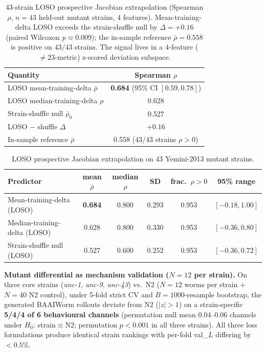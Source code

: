\documentclass[11pt]{article}
\begin{document}
\begin{table}[H]
\centering\small
\caption{43-strain LOSO prospective Jacobian extrapolation (Spearman $\rho$, $n{=}43$ held-out mutant strains, $4$ features). Mean-training-delta LOSO exceeds the strain-shuffle null by $\Delta{=}{+}0.16$ (paired Wilcoxon $p{\approx}0.009$); the in-sample reference $\bar\rho{=}0.558$ is positive on $43/43$ strains. The signal lives in a $4$-feature ($\ne 23$-metric) z-scored deviation subspace.}
\label{tab:loso_summary}
\begin{tabular}{lc}\toprule
Quantity & Spearman $\rho$ \\\midrule
LOSO mean-training-delta $\bar\rho$ & \textbf{0.684} (95\% CI $[0.59,0.78]$) \\
LOSO median-training-delta $\rho$ & 0.628 \\
Strain-shuffle null $\bar\rho_0$ & 0.527 \\
LOSO $-$ shuffle $\Delta$ & $+0.16$ \\
In-sample reference $\bar\rho$ & 0.558 ($43/43$ strains $\rho{>}0$) \\\bottomrule
\end{tabular}
\end{table}

\begin{table}[H]
\centering\small
\caption{LOSO prospective Jacobian extrapolation on 43 Yemini-2013 mutant strains.}
\label{tab:loso}
\begin{tabular}{lccccc}\toprule
Predictor & mean $\bar\rho$ & median $\rho$ & SD & frac.\ $\rho{>}0$ & 95\% range \\\midrule
Mean-training-delta (LOSO)   & \textbf{0.684} & 0.800 & 0.293 & 0.953 & $[-0.18,1.00]$ \\
Median-training-delta (LOSO) & 0.628 & 0.800 & 0.330 & 0.953 & $[-0.36,0.80]$ \\
Strain-shuffle null (LOSO)   & 0.527 & 0.600 & 0.252 & 0.953 & $[-0.36,0.72]$ \\\bottomrule
\end{tabular}
\end{table}

\textbf{Mutant differential as mechanism validation ($N{=}12$ per strain).} On three core strains (\textit{unc-1}, \textit{unc-9}, \textit{unc-43}) vs.\ N2 ($N{=}12$ worms per strain $+$ $N{=}40$ N2 control), under 5-fold strict CV and $B{=}1000$-resample bootstrap, the generated BAAIWorm rollouts deviate from N2 ($|z|{>}1$) on a strain-specific \textbf{5/4/4 of 6 behavioural channels} (permutation null mean $0.04$--$0.06$ channels under $H_0$: strain$\equiv$N2; permutation $p{<}0.001$ in all three strains). All three loss formulations produce identical strain rankings with per-fold val\_$L$ differing by ${<}0.5\%$.
\end{document}
